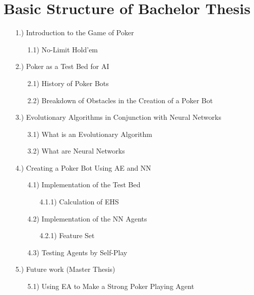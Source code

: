 \chapter{Basic Structure of Bachelor Thesis}
\begin{enumerate}
\item[1.)] Introduction to the Game of Poker
\begin{enumerate}
\item[1.1)] No-Limit Hold'em
\end{enumerate}
\item[2.)] Poker as a Test Bed for AI
\begin{enumerate}
\item[2.1)] History of Poker Bots
\item[2.2)] Breakdown of Obstacles in the Creation of a Poker Bot
\end{enumerate}
\item[3.)] Evolutionary Algorithms in Conjunction with Neural Networks
\begin{enumerate}
\item[3.1)] What is an Evolutionary Algorithm
\item[3.2)]  What are Neural Networks
\end{enumerate}
\item[4.)] Creating a Poker Bot Using AE and NN
\begin{enumerate}
\item[4.1)] Implementation of the Test Bed
\begin{enumerate}
\item[4.1.1)] Calculation of EHS
\end{enumerate}
\item[4.2)] Implementation of the NN Agents
\begin{enumerate}
\item[4.2.1)] Feature Set
\end{enumerate}
\item[4.3)] Testing Agents by Self-Play
\end{enumerate}
\item[5.)] Future work (Master Thesis)
\begin{enumerate}
\item[5.1)] Using EA to Make a Strong Poker Playing Agent
\end{enumerate}
\end{enumerate}

